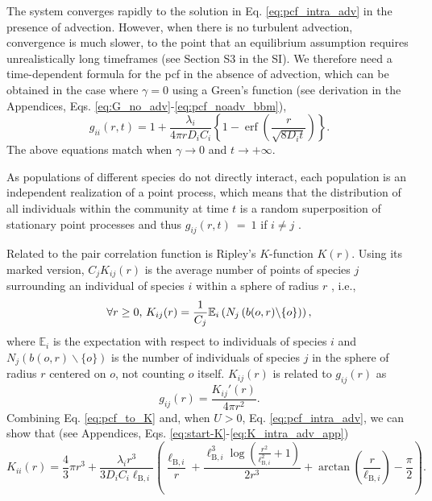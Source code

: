 \documentclass[12pt,english]{article}
\DeclareMathOperator\erf{erf}
\newcommand{\ellB}{\ell_{\mathrm{B},i}}
\begin{document}
The system converges rapidly to the solution in Eq. \ref{eq:pcf_intra_adv}
in the presence of advection. However, when there is no turbulent
advection, convergence is much slower, to the point that an equilibrium
assumption requires unrealistically long timeframes (see Section S3
in the SI). We therefore need a time-dependent formula for the pcf
in the absence of advection, which can be obtained in the case where
$\gamma=0$ using a Green's function (see derivation in the Appendices,
Eqs. \ref{eq:G_no_adv}-\ref{eq:pcf_noadv_bbm}), 
\begin{equation}
g_{ii}(r,t)=1+\frac{\lambda_{i}}{4\pi rD_{i}C_{i}}\left\{ 1-\erf\left(\frac{r}{\sqrt{8D_{i}t}}\right)\right\} .\label{eq:pcf_intra_noadv}
\end{equation}
The above equations match when $\gamma\rightarrow0$ and $t\rightarrow+\infty$.

As populations of different species do not directly interact, each
population is an independent realization of a point process, which
means that the distribution of all individuals within the community
at time $t$ is a random superposition of stationary point processes
and thus $g_{ij}(r,t)~=~1$ if $i\neq j$ \citep[ p. 326, eq. 5.3.13]{illian2008statistical}.\medskip{}

Related to the pair correlation function is Ripley's $K$-function
$K(r)$. Using its marked version, $C_{j}K_{ij}(r)$ is the average
number of points of species $j$ surrounding an individual of species
$i$ within a sphere of radius $r$ \citep{illian2008statistical},
i.e., 
\begin{equation}
\forall r\geq0\textmd{, }K_{ij}(r)=\frac{1}{C_{j}}\mathbb{E}_{i}\left(N_{j}\left(b(o,r)\backslash\{o\}\right)\right),
\end{equation}
where $\mathbb{E}_{i}$ is the expectation with respect to individuals
of species $i$ and $N_{j}\left(b(o,r)\backslash\{o\}\right)$ is
the number of individuals of species $j$ in the sphere of radius
$r$ centered on $o$, not counting $o$ itself. $K_{ij}(r)$ is related
to $g_{ij}(r)$ as 
\begin{equation}
g_{ij}(r)=\frac{K_{ij}'(r)}{4\pi r^{2}}.\label{eq:pcf_to_K}
\end{equation}
Combining Eq. \ref{eq:pcf_to_K} and, when $U>0$, Eq. \ref{eq:pcf_intra_adv},
we can show that (see Appendices, Eqs. \ref{eq:start-K}-\ref{eq:K_intra_adv_app})
\begin{equation}
K_{ii}(r)=\frac{4}{3}\pi r^{3}+\frac{\lambda_{i}r^{3}}{3D_{i}C_{i}\ellB}\left(\frac{\ellB}{r}+\frac{\ellB^{3}\log\left(\frac{r^{2}}{\ellB^{2}}+1\right)}{2r^{3}}+\arctan\left(\frac{r}{\ellB}\right)-\frac{\pi}{2}\right).\label{eq:K_intra_adv}
\end{equation}
\end{document}

